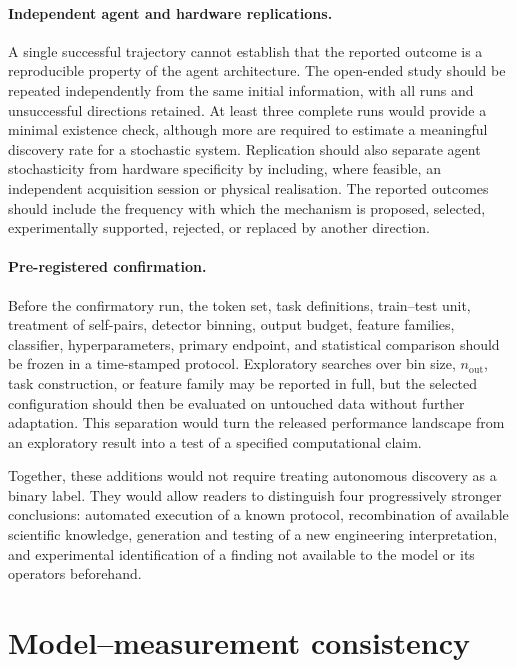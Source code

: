 \documentclass[11pt,a4paper]{article}
\begin{document}
\paragraph{Independent agent and hardware replications.}
A single successful trajectory cannot establish that the reported outcome is
a reproducible property of the agent architecture. The open-ended study
should be repeated independently from the same initial information, with all
runs and unsuccessful directions retained. At least three complete runs would
provide a minimal existence check, although more are required to estimate a
meaningful discovery rate for a stochastic system. Replication should also
separate agent stochasticity from hardware specificity by including, where
feasible, an independent acquisition session or physical realisation. The
reported outcomes should include the frequency with which the mechanism is
proposed, selected, experimentally supported, rejected, or replaced by
another direction.

\paragraph{Pre-registered confirmation.}
Before the confirmatory run, the token set, task definitions, train--test
unit, treatment of self-pairs, detector binning, output budget, feature
families, classifier, hyperparameters, primary endpoint, and statistical
comparison should be frozen in a time-stamped protocol. Exploratory searches
over bin size, $n_{\mathrm{out}}$, task construction, or feature family may be
reported in full, but the selected configuration should then be evaluated on
untouched data without further adaptation. This separation would turn the
released performance landscape from an exploratory result into a test of a
specified computational claim.

Together, these additions would not require treating autonomous discovery as
a binary label. They would allow readers to distinguish four progressively
stronger conclusions: automated execution of a known protocol, recombination
of available scientific knowledge, generation and testing of a new
engineering interpretation, and experimental identification of a finding
not available to the model or its operators beforehand.


\appendix

\section{Model--measurement consistency}
\label{sec:ideal}\label{app:ideal}
\end{document}
